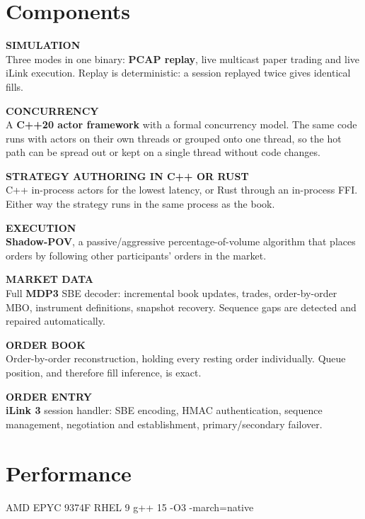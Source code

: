 \documentclass[10pt]{article}
\newcommand{\code}[1]{{\ttfamily\small #1}}
\newcommand{\tile}[2]{%
  {\color{ink3}\sffamily\bfseries\scriptsize\MakeUppercase{#1}}\\[1pt]
  \footnotesize #2\par\vspace{5pt}}
\begin{document}
\section{Components}
\vspace{2pt}

\noindent\begin{minipage}[t]{0.485\textwidth}

\tile{Simulation}{Three modes in one binary: \textbf{PCAP replay}, live
multicast paper trading and live iLink execution. Replay is deterministic: a
session replayed twice gives identical fills.}

\tile{Concurrency}{A \textbf{C++20 actor framework} with a formal
concurrency model. The same code runs with actors on their own threads or
grouped onto one thread, so the hot path can be spread out or kept on a single
thread without code changes.}

\tile{Strategy authoring in C++ or Rust}{C++ in-process actors for the lowest
latency, or Rust through an in-process FFI. Either way the strategy runs
in the same process as the book.}

\tile{Execution}{\textbf{Shadow-POV}, a passive/aggressive percentage-of-volume algorithm
that places orders by following other participants' orders in the market.}

\end{minipage}\hfill%
\begin{minipage}[t]{0.485\textwidth}

\tile{Market data}{Full \textbf{MDP3} SBE decoder: incremental book updates,
trades, order-by-order MBO, instrument definitions, snapshot recovery. Sequence
gaps are detected and repaired automatically.}

\tile{Order book}{Order-by-order reconstruction, holding every resting order
individually. Queue position, and therefore fill inference, is
exact.}

\tile{Order entry}{\textbf{iLink 3} session handler: SBE encoding, HMAC
authentication, sequence management, negotiation and establishment,
primary/secondary failover.}

\end{minipage}

\section{Performance}

\vspace{-2pt}
{\color{ink3}\footnotesize AMD EPYC 9374F \quad\textperiodcentered\quad RHEL 9
\quad\textperiodcentered\quad g++ 15 \quad\textperiodcentered\quad
\code{-O3 -march=native}}
\vspace{4pt}
\end{document}
